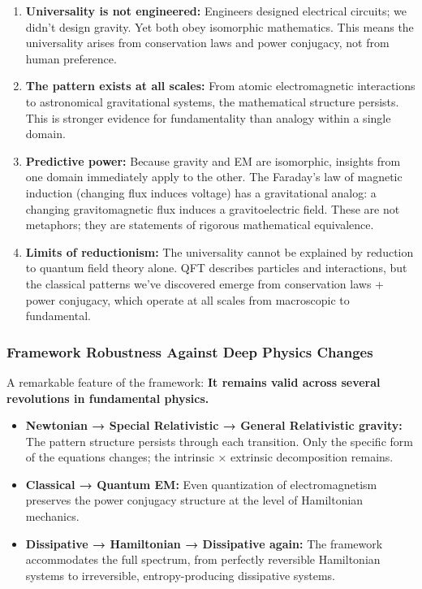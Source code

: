 \documentclass[
]{article}
\begin{document}
\begin{enumerate}
\def\labelenumi{\arabic{enumi}.}
\item
  \textbf{Universality is not engineered:} Engineers designed electrical
  circuits; we didn't design gravity. Yet both obey isomorphic
  mathematics. This means the universality arises from conservation laws
  and power conjugacy, not from human preference.
\item
  \textbf{The pattern exists at all scales:} From atomic electromagnetic
  interactions to astronomical gravitational systems, the mathematical
  structure persists. This is stronger evidence for fundamentality than
  analogy within a single domain.
\item
  \textbf{Predictive power:} Because gravity and EM are isomorphic,
  insights from one domain immediately apply to the other. The Faraday's
  law of magnetic induction (changing flux induces voltage) has a
  gravitational analog: a changing gravitomagnetic flux induces a
  gravitoelectric field. These are not metaphors; they are statements of
  rigorous mathematical equivalence.
\item
  \textbf{Limits of reductionism:} The universality cannot be explained
  by reduction to quantum field theory alone. QFT describes particles
  and interactions, but the classical patterns we've discovered emerge
  from conservation laws + power conjugacy, which operate at all scales
  from macroscopic to fundamental.
\end{enumerate}

\subsubsection{Framework Robustness Against Deep Physics
Changes}\label{framework-robustness-against-deep-physics-changes}

A remarkable feature of the framework: \textbf{It remains valid across
several revolutions in fundamental physics.}

\begin{itemize}
\item
  \textbf{Newtonian → Special Relativistic → General Relativistic
  gravity:} The pattern structure persists through each transition. Only
  the specific form of the equations changes; the intrinsic × extrinsic
  decomposition remains.
\item
  \textbf{Classical → Quantum EM:} Even quantization of electromagnetism
  preserves the power conjugacy structure at the level of Hamiltonian
  mechanics.
\item
  \textbf{Dissipative → Hamiltonian → Dissipative again:} The framework
  accommodates the full spectrum, from perfectly reversible Hamiltonian
  systems to irreversible, entropy-producing dissipative systems.
\end{itemize}
\end{document}
